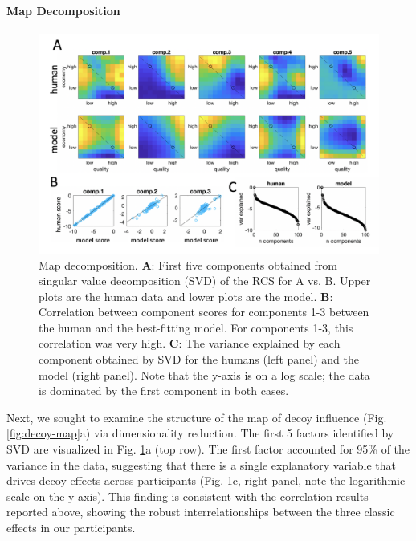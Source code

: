 \documentclass[a4paper, nobind]{templates/ociamthesis}
\begin{document}
\hypertarget{map-decomposition-1}{%
\paragraph{Map Decomposition}\label{map-decomposition-1}}

\begin{figure}

{\centering \includegraphics[width=1\linewidth]{figures/decoy-svd} 

}

\caption[Map decomposition]{Map decomposition. $\textbf{A:}$ First five components obtained from singular value decomposition (SVD) of the RCS for A vs. B. Upper plots are the human data and lower plots are the model. $\textbf{B:}$ Correlation between component scores for components 1-3 between the human and the best-fitting model. For components 1-3, this correlation was very high. $\textbf{C:}$ The variance explained by each component obtained by SVD for the humans (left panel) and the model (right panel). Note that the y-axis is on a log scale; the data is dominated by the first component in both cases.}\label{fig:decoy-svd}
\end{figure}

Next, we sought to examine the structure of the map of decoy influence (Fig. \ref{fig:decoy-map}a) via dimensionality reduction. The first 5 factors identified by SVD are visualized in Fig. \ref{fig:decoy-svd}a (top row). The first factor accounted for 95\% of the variance in the data, suggesting that there is a single explanatory variable that drives decoy effects across participants (Fig. \ref{fig:decoy-svd}c, right panel, note the logarithmic scale on the y-axis). This finding is consistent with the correlation results reported above, showing the robust interrelationships between the three classic effects in our participants.
\end{document}
